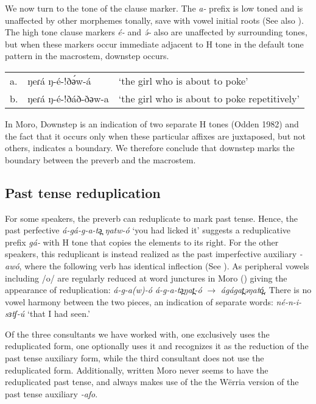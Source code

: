 We now turn to the tone of the clause marker. The \textit{a-} prefix is low toned and is unaffected by other morphemes tonally, save with vowel initial roots (See also ). The high tone clause markers \textit{é-} and \textit{ ə́- } also are unaffected by surrounding tones, but when these markers occur immediate adjacent to H tone in the default tone pattern in the macrostem, downstep occurs.

\ea  \begin{tabular}[t]{lll}
  	a. & 	 ŋeɾá ŋ-é-!ðә́w-á 	 &  `the girl who is about to poke'\\
	b. & 	ŋeɾá ŋ-é-!ðáð-ðәw-a  & 	`the girl who is about to poke repetitively' \\ 
  \end{tabular}
\z 
In Moro, Downstep is an indication of two separate H tones (Odden 1982) and the fact that it occurs only when these particular affixes are juxtaposed, but not others, indicates a boundary. We therefore conclude that downstep marks the boundary between the preverb and the macrostem.
	
\subsection{Past tense reduplication}\label{sec:ch11:past}

For some speakers, the preverb can reduplicate to mark past tense. Hence, the past perfective \textit{á-gá-g-a-tə̪ ŋatw-ó} ‘you had licked it’ suggests a reduplicative prefix \textit{gá-} with H tone that copies the elements to its right. For the other speakers, this reduplicant is instead realized as the past imperfective auxiliary \textit{-awó}, where the following verb has identical inflection (See ). As peripheral vowels including /o/ are regularly reduced at word junctures in Moro ()  giving the appearance of reduplication: \textit{á-g-a(w)-ó á-g-a-tə̪ŋat̪-ó} $\rightarrow$ \textit{ágágat̪əŋató̪}. There is no vowel harmony between the two pieces, an indication of separate words: \textit{né-n-i-sɜtʃ-ú} ‘that I had seen.’ %

Of the three consultants we have worked with, one exclusively uses the reduplicated form, one optionally uses it and recognizes it as the reduction of the past tense auxiliary form, while the third consultant does not use the reduplicated form. Additionally, written Moro never seems to have the reduplicated past tense, and always makes use of the the Wërria version of the past tense auxiliary \textit{-afo}. %



